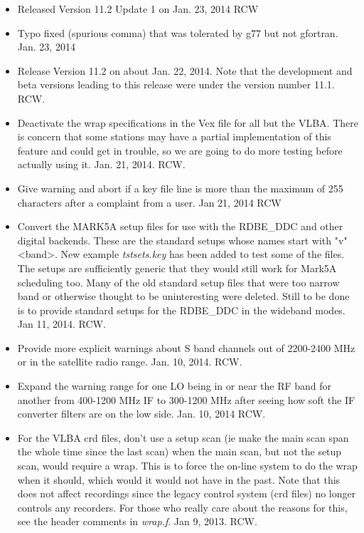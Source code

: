 \documentclass{report}
\begin{document}
\begin{itemize}

\item  Released Version 11.2 Update 1 on Jan. 23, 2014  RCW

\item  Typo fixed (spurious comma) that was tolerated by g77 but
not gfortran.  Jan. 23, 2014

\item  Release Version 11.2 on about Jan. 22, 2014.  Note that the
development and beta versions leading to this release were under
the version number 11.1.  RCW.

\item  Deactivate the wrap specifications in the Vex file for all but
the VLBA.  There is concern that some stations may have a partial 
implementation of this feature and could get in trouble, so we are going
to do more testing before actually using it.  Jan. 21, 2014.  RCW.

\item  Give warning and  abort if  a key  file line  is more  than the
maximum of 255 characters after a complaint from a  user.  Jan 21, 2014
RCW

\item Convert the MARK5A setup files for use with the RDBE\_DDC and
other digital backends.  These are the standard setups whose names
start with "v" <band>.  New example {\sl tstsets.key} has been added
to test some of the files.  The setups are sufficiently generic that
they would still work for Mark5A scheduling too.  Many of the old
standard setup files that were too narrow band or otherwise thought to
be uninteresting were deleted.  Still to be done is to provide standard
setups for the RDBE\_DDC in the wideband modes.  Jan 11, 2014.  RCW.

\item Provide more explicit warnings about S band channels out of 
2200-2400 MHz or in the satellite radio range.  Jan. 10, 2014.  RCW.

\item Expand the warning range for one LO being in or near the RF band
for another from 400-1200 MHz IF to 300-1200 MHz after seeing how soft
the IF converter filters are on the low side.  Jan. 10, 2014  RCW.

\item For the VLBA crd files, don't use a setup scan (ie make the main
scan span the whole time since the last scan) when the main scan, but
not the setup scan, would require a wrap.  This is to force the on-line
system to do the wrap when it should, which would it would not have in the
past.  Note that this does not affect recordings since the legacy control
system (crd files) no longer controls any recorders.  For those who really
care about the reasons for this, see the header comments in {\sl wrap.f}. 
Jan 9, 2013.  RCW.


\end{itemize}
\end{document}
